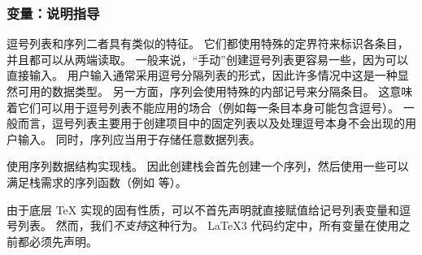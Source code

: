 \documentclass[full]{l3doc}
\begin{document}
%
\subsubsection{变量：说明指导}

%
逗号列表和序列二者具有类似的特征。
它们都使用特殊的定界符来标识各条目，并且都可以从两端读取。
一般来说，“手动”创建逗号列表更容易一些，因为可以直接输入。
用户输入通常采用逗号分隔列表的形式，因此许多情况中这是一种显然可用的数据类型。
另一方面，序列会使用特殊的内部记号来分隔条目。
这意味着它们可以用于逗号列表不能应用的场合（例如每一条目本身可能包含逗号）。
一般而言，逗号列表主要用于创建项目中的固定列表以及处理逗号本身不会出现的用户输入。
同时，序列应当用于存储任意数据列表。

%

 使用序列数据结构实现栈。
因此创建栈会首先创建一个序列，然后使用一些可以满足栈需求的序列函数（例如  等）。

%
由于底层 \TeX{} 实现的固有性质，可以不首先声明就直接赋值给记号列表变量和逗号列表。
然而，我们\emph{不支持}这种行为。
\LaTeX3 代码约定中，所有变量在使用之前都必须先声明。
\end{document}
